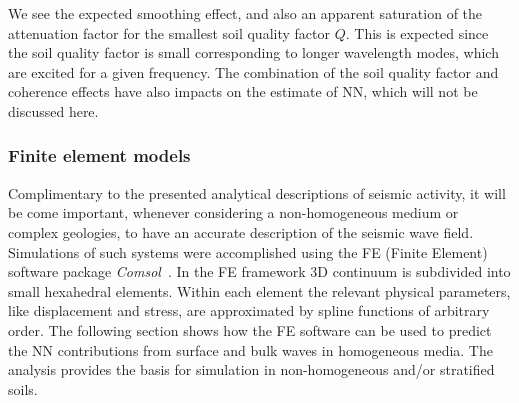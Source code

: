 We see the expected smoothing effect, and also an apparent saturation of the
attenuation factor for the smallest soil quality factor $Q$. This is expected
since the soil quality factor is small corresponding to longer wavelength
modes, which are excited for a given frequency. The combination of the soil
quality factor and coherence effects have also impacts on the estimate of NN,
which will not be discussed here.

\FloatBarrier
\subsubsection{Finite element models}
\label{subsub:NNfiniteelementmodels}
Complimentary to the presented analytical descriptions of seismic activity, it will be come important, whenever considering a non-homogeneous medium or complex geologies, to have an accurate description of the seismic wave field. Simulations of such systems were accomplished using the FE (Finite Element) software package \textit{Comsol}~\cite{comsol}. In the FE framework 3D continuum is subdivided into small hexahedral elements. Within each element the relevant physical parameters, like displacement and stress, are approximated by spline functions of arbitrary order. The following section shows how the FE software can be used to predict the NN contributions from surface and bulk waves in homogeneous media. The analysis provides the basis for simulation in non-homogeneous and/or stratified soils.

